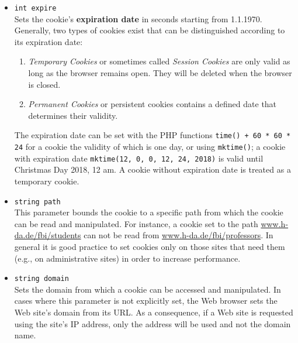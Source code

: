 \documentclass[a4paper, justified, notoc]{tufte-handout} %
\begin{document}
\begin{itemize}
	\item \texttt{int expire} \\Sets the cookie's \textbf{expiration date} in seconds starting from 1.1.1970. Generally, two types of cookies exist that can be distinguished according to its expiration date: 
	\begin{enumerate}
		\item \emph{Temporary Cookies} or sometimes called \emph{Session Cookies} are only valid as long as the browser remains open. They will be deleted when the browser is closed.
		\item \emph{Permanent Cookies} or persistent cookies contains a defined date that determines their validity.
	\end{enumerate}
	The expiration date can be set with the PHP functions \texttt{time() + 60 * 60 * 24} for a cookie the validity of which is one day, or using \texttt{mktime()}; a cookie with expiration date \texttt{mktime(12, 0, 0, 12, 24, 2018)} is valid until Christmas Day 2018, 12 am.
	A cookie without expiration date is treated as a temporary cookie.
	
	\item \texttt{string path} \\ This parameter bounds the cookie to a specific path from which the cookie can be read and manipulated. For instance, a cookie set to the path \url{www.h-da.de/fbi/students} can not be read from \url{www.h-da.de/fbi/professors}. 
	In general it is good practice to set cookies only on those sites that need them (e.g., on administrative sites) in order to increase performance. 
	
	\item \texttt{string domain} \\ Sets the domain from which a cookie can be accessed and manipulated. In cases where this parameter is not explicitly set, the Web browser sets the Web site's domain from its URL. As a consequence, if a Web site is requested using the site's IP address, only the address will be used and not the domain name. 
	
	

\end{itemize}
\end{document}
